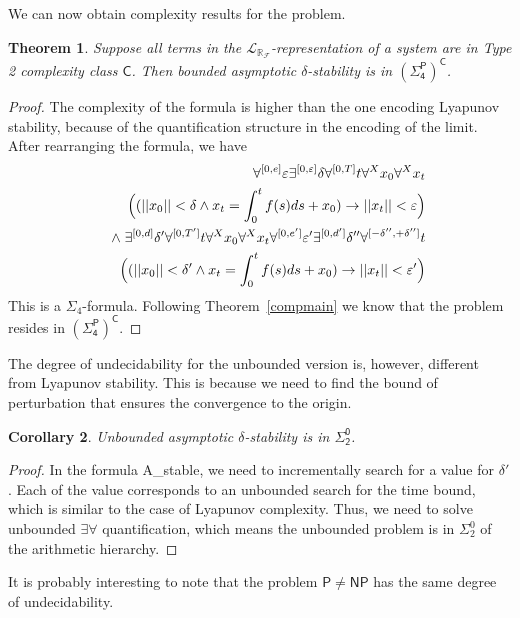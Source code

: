 \documentclass[10pt]{article}
\theoremstyle{plain}
\newtheorem{theorem}{Theorem}[section]
\newtheorem{corollary}[theorem]{Corollary}
\theoremstyle{definition}
\newcommand{\p}{\mathsf{P}}
\newcommand{\np}{\mathsf{NP}}
\newcommand{\lrf}{\mathcal{L}_{\mathbb{R}_{\mathcal{F}}}}
\begin{document}
We can now obtain complexity results for the problem. 
\begin{theorem}
Suppose all terms in the $\lrf$-representation of a system are in Type 2 complexity class $\mathsf{C}$. Then bounded asymptotic $\delta$-stability is in $\mathsf{{(\Sigma_4^P)}^C}$.
\end{theorem}
\begin{proof}
The complexity of the formula is higher than the one encoding Lyapunov stability, because of the quantification structure in the encoding of the limit. After rearranging the formula, we have
\begin{eqnarray*}
& &\forall^{[0,e]} \varepsilon\exists^{[0,\varepsilon]} \delta\forall^{[0,T]} t\forall^X x_0\forall^X x_t\\
& &\hspace{.5cm}\Big((||x_0||<\delta \wedge x_t = \int_0^t f(s)ds + x_0 )\rightarrow ||x_t||<\varepsilon\Big)\\
& &\wedge\; \exists^{[0,d]} \delta'  \forall^{[0,T']} t\forall^X x_0\forall^X x_t\forall^{[0,e']} \varepsilon' \exists^{[0,d']} \delta'' \forall^{[-\delta'',+\delta'']}t \\
& & \hspace{.3cm}\Big( (||x_0||<\delta'\wedge x_t = \int_0^t f(s)ds + x_0 )\rightarrow ||x_t|| < \varepsilon'\Big) 
\end{eqnarray*}
This is a $\Sigma_4$-formula. Following Theorem~\ref{compmain} we know that the problem resides in $\mathsf{{(\Sigma_4^P)}^C}$. 
\end{proof}
The degree of undecidability for the unbounded version is, however, different from Lyapunov stability. This is because we need to find the bound of perturbation that ensures the convergence to the origin. 
\begin{corollary}
Unbounded asymptotic $\delta$-stability is in $\mathsf{\Sigma^0_2}$. 
\end{corollary}
\begin{proof}
In the formula {\sf A\_stable}, we need to incrementally search for a value for $\delta'$. Each of the value corresponds to an unbounded search for the time bound, which is similar to the case of Lyapunov complexity. Thus, we need to solve unbounded $\exists\forall$ quantification, which means the unbounded problem is in $\Sigma^0_2$ of the arithmetic hierarchy. 
\end{proof}
It is probably interesting to note that the problem $\p\neq \np$ has the same degree of undecidability. 
\end{document}
